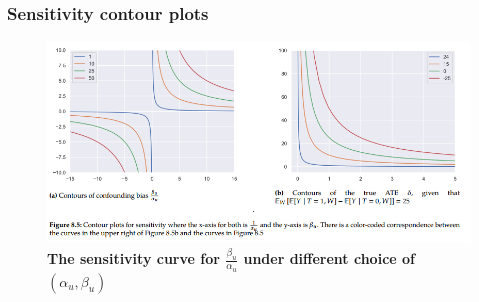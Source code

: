 \documentclass[11pt]{article}
\begin{document}
\subsubsection{Sensitivity contour plots}

\begin{figure}
\begin{minipage}[t]{1\linewidth}
  \centering
  \centerline{\includegraphics[scale = 0.55]{sensitivity_curve.png}}
\end{minipage}
\caption{\footnotesize{\textbf{The sensitivity curve for $\frac{\beta_u}{\alpha_u}$ under different choice of  $(\alpha_u, \beta_u)$  \citep{neal2020introduction}}}}
\label{fig: sensitivity_curve}
\end{figure}
\end{document}
